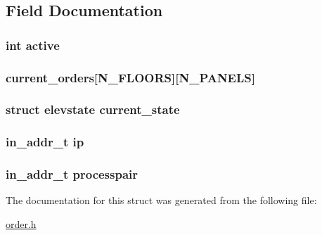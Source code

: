 \subsection{Field Documentation}
\hypertarget{structelevator_aa5805c5e936174e5092bf7a5b78e7e64}{
\subsubsection[{active}]{\setlength{\rightskip}{0pt plus 5cm}int active}}\label{structelevator_aa5805c5e936174e5092bf7a5b78e7e64}
\hypertarget{structelevator_a20607bdcd87be2326f86a21a642ec6bd}{
\subsubsection[{current\-\_\-orders}]{ current\-\_\-orders\mbox{[}{\bf N\-\_\-\-F\-L\-O\-O\-R\-S}\mbox{]}\mbox{[}{\bf N\-\_\-\-P\-A\-N\-E\-L\-S}\mbox{]}}}\label{structelevator_a20607bdcd87be2326f86a21a642ec6bd}
\hypertarget{structelevator_ac3557e8a9efc9856e2ecb6976579a4a8}{
\subsubsection[{current\-\_\-state}]{\setlength{\rightskip}{0pt plus 5cm}struct {\bf elevstate} current\-\_\-state}}\label{structelevator_ac3557e8a9efc9856e2ecb6976579a4a8}
\hypertarget{structelevator_a576f19065d49f151479e4fd2df18670b}{
\subsubsection[{ip}]{\setlength{\rightskip}{0pt plus 5cm}in\-\_\-addr\-\_\-t ip}}\label{structelevator_a576f19065d49f151479e4fd2df18670b}
\hypertarget{structelevator_a75130e4f928affbd1f4fa96bde8ca404}{
\subsubsection[{processpair}]{\setlength{\rightskip}{0pt plus 5cm}in\-\_\-addr\-\_\-t processpair}}\label{structelevator_a75130e4f928affbd1f4fa96bde8ca404}


The documentation for this struct was generated from the following file\-:\begin{DoxyCompactItemize}
\item 
\hyperlink{order_8h}{order.\-h}\end{DoxyCompactItemize}
